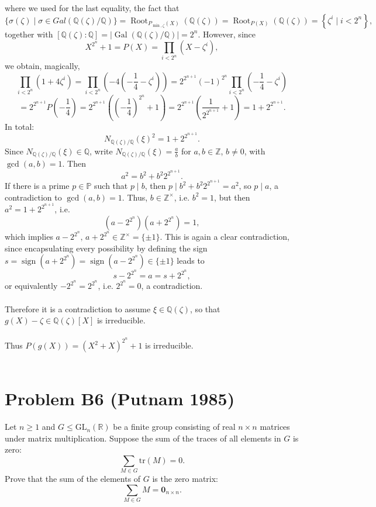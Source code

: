 \documentclass[11pt, a4paper, oneside]{article}
\newcommand{\problem}[1][]{\section{#1} \hfill \par}
\theoremstyle{remark}
\theoremstyle{lemma}
\begin{document}
where we used for the last equality, the fact that  
\[
\{\sigma(\zeta)\mid\sigma\in Gal(\mathbb{Q}(\zeta)/\mathbb{Q})\}=\operatorname{Root}_{P_{\min, \zeta}(X)}\left( \mathbb{Q}(\zeta) \right) = \operatorname{Root}_{P(X)}\left( \mathbb{Q}(\zeta) \right) = \left\{ \zeta^i \mid i < 2^n \right\},
\]
together with \( \left[ \mathbb{Q}(\zeta) : \mathbb{Q} \right] = \left| \operatorname{Gal}\left( \mathbb{Q}(\zeta)/\mathbb{Q} \right) \right|=2^n \). However, since \[
X^{2^n} + 1 = P(X) = \prod_{i < 2^n} \left( X - \zeta^{i} \right),
\]
we obtain, magically,
\[
\prod_{i < 2^n} \left( 1 + 4\zeta^{i} \right) = \prod_{i < 2^n} \left( -4\left( -\frac{1}{4} - \zeta^{i} \right) \right) = 2^{2^{n+1}} (-1)^{2^n} \prod_{i < 2^n} \left( -\frac{1}{4} - \zeta^{i} \right)
\]
\[
= 2^{2^{n+1}} P\left( -\frac{1}{4} \right) = 2^{2^{n+1}} \left( \left( -\frac{1}{4} \right)^{2^n} + 1 \right) = 2^{2^{n+1}} \left( \frac{1}{2^{2^{n+1}}} + 1 \right) = 1 + 2^{2^{n+1}}.
\]
In total:
\[
N_{\mathbb{Q}(\zeta)/\mathbb{Q}}(\xi)^2 = 1 + 2^{2^{n+1}}.
\]
Since \( N_{\mathbb{Q}(\zeta)/\mathbb{Q}}(\xi) \in \mathbb{Q} \), write \( N_{\mathbb{Q}(\zeta)/\mathbb{Q}}(\xi) = \frac{a}{b} \) for \( a, b \in \mathbb{Z} \), \( b \neq 0 \), with \( \gcd(a, b) = 1 \). Then
\[
a^2 = b^2 + b^2 2^{2^{n+1}}.
\]
If there is a prime \( p \in \mathbb{P} \) such that \( p \mid b \), then \( p \mid b^2 + b^2 2^{2^{n+1}} = a^2 \), so \( p \mid a \), a contradiction to \( \gcd(a, b) = 1 \). Thus, \( b \in \mathbb{Z}^{\times} \), i.e. \( b^2 = 1 \), but then \( a^2 = 1 + 2^{2^{n+1}} \), i.e.
\[
\left( a - 2^{2^n} \right)\left( a + 2^{2^n} \right) = 1,
\]
which implies \( a - 2^{2^n},\, a + 2^{2^n} \in \mathbb{Z}^{\times} = \{ \pm 1 \} \). This is again a clear contradiction, since encapsulating every possibility by defining the sign \( s = \operatorname{sign}(a + 2^{2^n}) = \operatorname{sign}(a - 2^{2^n}) \in \{ \pm 1 \} \) leads to
\[
s - 2^{2^n} = a = s + 2^{2^n},
\]
or equivalently \( -2^{2^n} = 2^{2^n} \), i.e. \( 2^{2^n} = 0 \), a contradiction.
\\\\
Therefore it is a contradiction to assume $\xi\in\mathbb{Q}(\zeta)$, so that $g(X)-\zeta\in\mathbb{Q}(\zeta)[X]$ is irreducible.
\\\\
Thus \(P(g(X))=\left(X^2+X\right)^{2^n}+1\) is irreducible.
\\\\
\newpage
\problem[Problem B6 (Putnam 1985)]
Let \( n \geq 1 \) and \( G \leq \mathrm{GL}_n(\mathbb{R}) \) be a finite group consisting of real \( n \times n \) matrices under matrix multiplication. Suppose the sum of the traces of all elements in \( G \) is zero:
\[
\sum_{M \in G} \mathrm{tr}(M) = 0.
\]
Prove that the sum of the elements of \( G \) is the zero matrix:
\[
\sum_{M \in G} M = \mathbf{0}_{n \times n}.
\]
\end{document}
